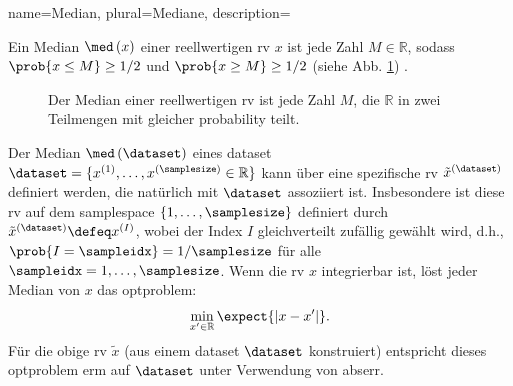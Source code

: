 {{
{name={Median}, 
plural={Mediane},
description={Ein Median $\med\,(x)$ einer reellwertigen \gls{rv} $x$ 
 		ist jede Zahl $M \in \mathbb{R}$, sodass $\prob{ x \leq M} \geq 1/2$ und 
		$\prob{ x \geq M} \geq 1/2$ 
		(siehe Abb. \ref{fig_median1_dict}) \cite{LC}. 
 		\begin{figure}[H]
			\begin{center}
			\end{center}
			\caption{Der Median einer reellwertigen \gls{rv} ist jede Zahl $M$, 
			die $\mathbb{R}$ in zwei Teilmengen mit gleicher \gls{probability} teilt. \label{fig_median1_dict}}
 		\end{figure}  
 		Der Median $\med\,(\dataset)$ 
 		eines \gls{dataset} $\dataset = \{ x^{(1)}, \ldots, x^{(\samplesize)} \in \mathbb{R} \}$ 
 		kann über eine spezifische \gls{rv} $\tilde{x}^{(\dataset)}$ definiert werden, die natürlich mit $\dataset$ assoziiert ist. 
 		Insbesondere ist diese \gls{rv} auf dem \gls{samplespace} $\{1, \ldots, \samplesize\}$ definiert durch $\tilde{x}^{(\dataset)} \defeq x^{(I)}$, wobei der Index $I$ gleichverteilt zufällig gewählt wird, d.h., $\prob{I = \sampleidx}=1/\samplesize$ für alle $\sampleidx=1, \ldots, \samplesize$. Wenn die \gls{rv} $x$ integrierbar ist, löst jeder Median von $x$ das \gls{optproblem}: 
 		$$\min_{x' \in \mathbb{R}} \expect{|x - x'|}.$$ 
		Für die obige \gls{rv} $\tilde{x}$ (aus einem \gls{dataset} $\dataset$ konstruiert) entspricht dieses \gls{optproblem} \gls{erm} auf $\dataset$ unter Verwendung von \gls{abserr}. 
}}}}
